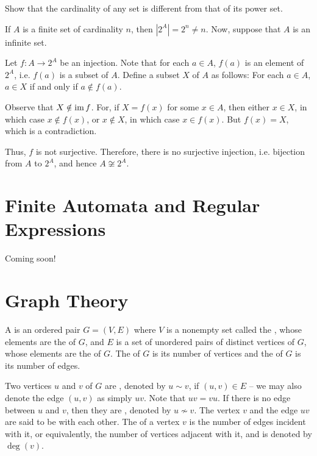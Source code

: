 \begin{Exercise}
Show that the cardinality of any set is different from that of its power set.
\end{Exercise}

\begin{Solution*}
If $A$ is a finite set of cardinality $n$, then $|2^A| = 2^n \ne n$. Now, suppose that $A$ is an infinite set.

Let $f \colon A \to 2^A$ be an injection. Note that for each $a \in A$, $f(a)$ is an element of $2^A$, i.e. $f(a)$ is a subset of $A$. Define a subset $X$ of $A$ as follows: For each $a \in A$, $a \in X$ if and only if $a \notin f(a)$.

Observe that $X \notin \operatorname{im} f$. For, if $X = f(x)$ for some $x \in A$, then either $x \in X$, in which case $x \notin f(x)$, or $x \notin X$, in which case $x \in f(x)$. But $f(x) = X$, which is a contradiction.

Thus, $f$ is not surjective. Therefore, there is no surjective injection, i.e. bijection from $A$ to $2^A$, and hence $A \not\cong 2^A$.
\end{Solution*}


\section{Finite Automata and Regular Expressions}\label{sec:FAandRE}

{\tiny Coming soon!}


\section{Graph Theory}\label{sec:GraphTheory}

A  is an ordered pair $G = (V, E)$ where $V$ is a nonempty set called the , whose elements are the  of $G$, and $E$ is a set of unordered pairs of distinct vertices of $G$, whose elements are the  of $G$. The  of $G$ is its number of vertices and the  of $G$ is its number of edges.

Two vertices $u$ and $v$ of $G$ are , denoted by $u \sim v$, if $(u,v) \in E$ -- we may also denote the edge $(u,v)$ as simply $uv$. Note that $uv = vu$. If there is no edge between $u$ and $v$, then they are , denoted by $u \nsim v$. The vertex $v$ and the edge $uv$ are said to be  with each other. The  of a vertex $v$ is the number of edges incident with it, or equivalently, the number of vertices adjacent with it, and is denoted by $\deg(v)$.

